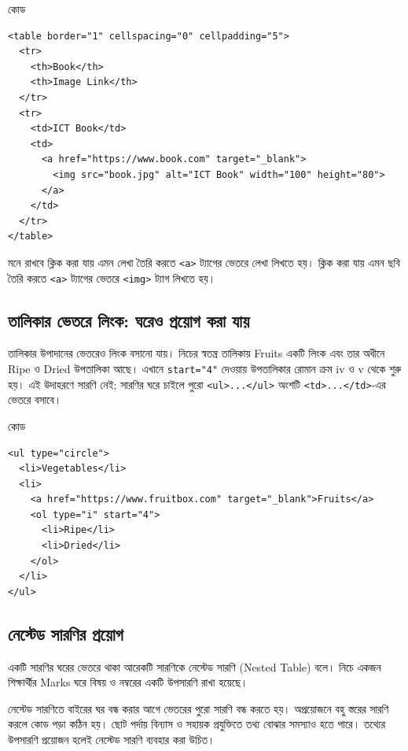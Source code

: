\begin{examplebox}{কোড}
\begin{verbatim}
<table border="1" cellspacing="0" cellpadding="5">
  <tr>
    <th>Book</th>
    <th>Image Link</th>
  </tr>
  <tr>
    <td>ICT Book</td>
    <td>
      <a href="https://www.book.com" target="_blank">
        <img src="book.jpg" alt="ICT Book" width="100" height="80">
      </a>
    </td>
  </tr>
</table>
\end{verbatim}
\end{examplebox}

\begin{keypointbox}{মনে রাখবে}
ক্লিক করা যায় এমন লেখা তৈরি করতে \texttt{<a>} ট্যাগের ভেতরে লেখা লিখতে হয়। ক্লিক করা যায় এমন ছবি তৈরি করতে \texttt{<a>} ট্যাগের ভেতরে \texttt{<img>} ট্যাগ লিখতে হয়।
\end{keypointbox}

\subsection{তালিকার ভেতরে লিংক: ঘরেও প্রয়োগ করা যায়}

তালিকার উপাদানের ভেতরেও লিংক বসানো যায়। নিচের স্বতন্ত্র তালিকায় Fruits একটি লিংক এবং তার অধীনে Ripe ও Dried উপতালিকা আছে। এখানে \texttt{start="4"} দেওয়ায় উপতালিকার রোমান ক্রম iv ও v থেকে শুরু হয়। এই উদাহরণে সারণি নেই; সারণির ঘরে চাইলে পুরো \texttt{<ul>...</ul>} অংশটি \texttt{<td>...</td>}-এর ভেতরে বসাবে।

\begin{examplebox}{কোড}
\begin{verbatim}
<ul type="circle">
  <li>Vegetables</li>
  <li>
    <a href="https://www.fruitbox.com" target="_blank">Fruits</a>
    <ol type="i" start="4">
      <li>Ripe</li>
      <li>Dried</li>
    </ol>
  </li>
</ul>
\end{verbatim}
\end{examplebox}

\subsection{নেস্টেড সারণির প্রয়োগ}

একটি সারণির ঘরের ভেতরে থাকা আরেকটি সারণিকে নেস্টেড সারণি (Nested Table) বলে। নিচে একজন শিক্ষার্থীর Marks ঘরে বিষয় ও নম্বরের একটি উপসারণি রাখা হয়েছে।

নেস্টেড সারণিতে বাইরের ঘর বন্ধ করার আগে ভেতরের পুরো সারণি বন্ধ করতে হয়। অপ্রয়োজনে বহু স্তরের সারণি করলে কোড পড়া কঠিন হয়। ছোট পর্দায় বিন্যাস ও সহায়ক প্রযুক্তিতে তথ্য বোঝার সমস্যাও হতে পারে। তথ্যের উপসারণি প্রয়োজন হলেই নেস্টেড সারণি ব্যবহার করা উচিত।

